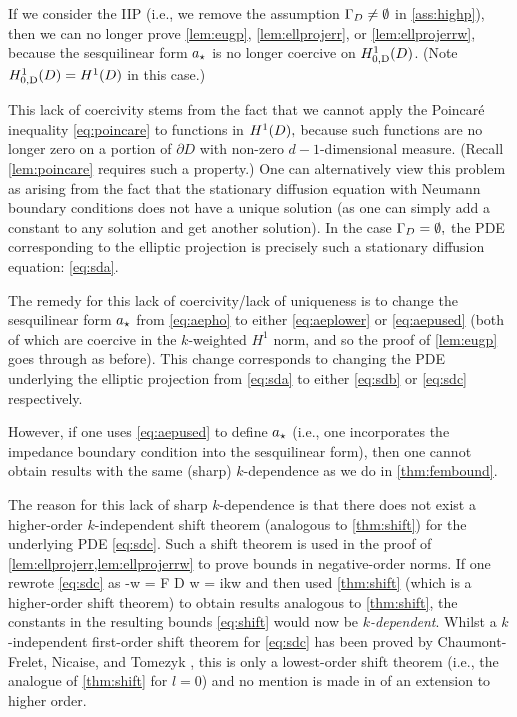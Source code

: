 \label{rem:epdef}
If we consider the IIP (i.e., we remove the assumption $\Gamma_{D} \neq \emptyset$ in \cref{ass:highp}), then we can no longer prove  \ref{lem:eugp}, \ref{lem:ellprojerr}, or \ref{lem:ellprojerrw}, because the sesquilinear form $a_{\star}$ is no longer coercive on $\HozDD$. (Note $\HozDD = \HoD$ in this case.)

This lack of coercivity stems from the fact that we cannot apply the Poincar\'e inequality \cref{eq:poincare} to functions in $\HoD,$ because such functions are no longer zero on a portion of $\partial D$ with non-zero $d-1$-dimensional measure. (Recall \cref{lem:poincare} requires such a property.) One can alternatively view this problem as arising from the fact that the stationary diffusion equation with Neumann boundary conditions does not have a unique solution (as one can simply add a constant to any solution and get another solution). In the case $\Gamma_{D}=\emptyset,$ the PDE corresponding to the elliptic projection is precisely such a stationary diffusion equation: \cref{eq:sda}.

The remedy for this lack of coercivity/lack of uniqueness is to change the sesquilinear form $a_{\star}$ from \cref{eq:aepho} to either \cref{eq:aeplower} or \cref{eq:aepused} (both of which are coercive in the $k$-weighted $H^1$ norm, and so the proof of \cref{lem:eugp} goes through as before). This change corresponds to changing the PDE underlying the elliptic projection from \cref{eq:sda} to either \cref{eq:sdb} or \cref{eq:sdc} respectively.

However, if one uses \cref{eq:aepused} to define $a_{\star}$ (i.e., one incorporates the impedance boundary condition into the sesquilinear form), then one cannot obtain results with the same (sharp) $k$-dependence as we do in \cref{thm:fembound}.

The reason for this lack of sharp $k$-dependence is that there does not exist a higher-order $k$-indepen\-dent shift theorem (analogous to \cref{thm:shift}) for the underlying PDE \cref{eq:sdc}. Such a shift theorem is used in the proof of \cref{lem:ellprojerr,lem:ellprojerrw} to prove bounds in negative-order norms. If one rewrote \cref{eq:sdc} as
\beqs
-\Delta w = F  \tin D \tand
\eeqs
\beqs
\dn w = ikw \ton \GI
\eeqs
and then used \cref{thm:shift} (which is a higher-order shift theorem) to obtain results analogous to \cref{thm:shift}, the constants in the resulting bounds \cref{eq:shift} would now be \emph{$k$-dependent}. Whilst a $k$-independent first-order shift theorem for \cref{eq:sdc}  has been proved by Chaumont-Frelet, Nicaise, and Tomezyk \cite[Theorems 3.1, 4.3, and 5.1]{ChNiTo:18}, this is only a lowest-order shift theorem (i.e., the analogue of \cref{thm:shift} for $l=0$) and no mention is made in \cite{ChNiTo:18} of an extension to higher order.

